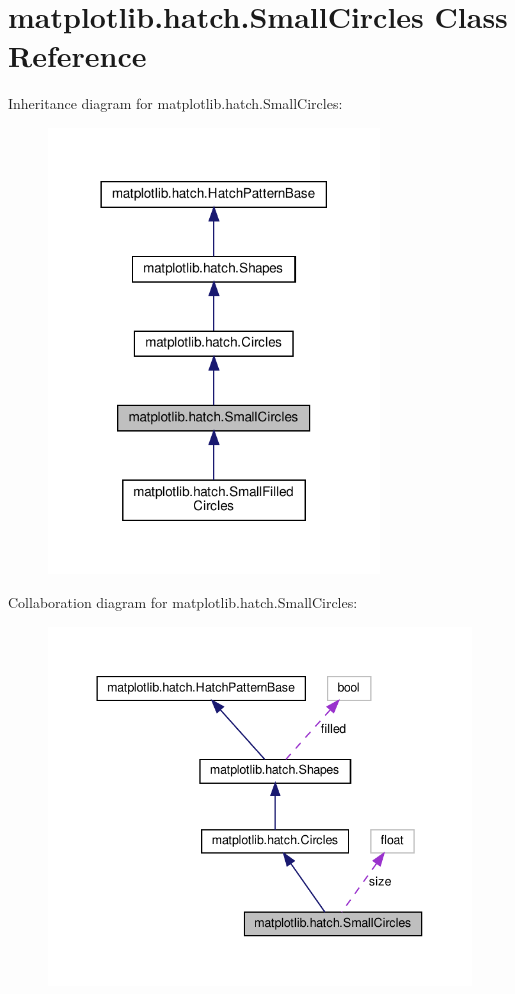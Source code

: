 \hypertarget{classmatplotlib_1_1hatch_1_1SmallCircles}{}\section{matplotlib.\+hatch.\+Small\+Circles Class Reference}
\label{classmatplotlib_1_1hatch_1_1SmallCircles}


Inheritance diagram for matplotlib.\+hatch.\+Small\+Circles\+:
\nopagebreak
\begin{figure}[H]
\begin{center}
\leavevmode
\includegraphics[width=249pt]{classmatplotlib_1_1hatch_1_1SmallCircles__inherit__graph}
\end{center}
\end{figure}


Collaboration diagram for matplotlib.\+hatch.\+Small\+Circles\+:
\nopagebreak
\begin{figure}[H]
\begin{center}
\leavevmode
\includegraphics[width=344pt]{classmatplotlib_1_1hatch_1_1SmallCircles__coll__graph}
\end{center}
\end{figure}

